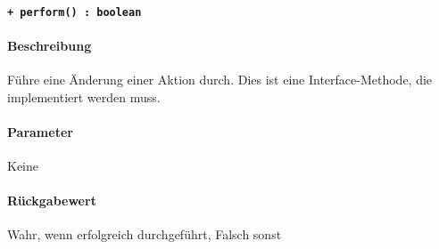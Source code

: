 \paragraph{\texttt{+ perform() : boolean}}%
\paragraph*{Beschreibung}
Führe eine Änderung einer Aktion durch.
Dies ist eine Interface-Methode, die implementiert werden muss.
\paragraph*{Parameter}
Keine
\paragraph*{Rückgabewert}
Wahr, wenn erfolgreich durchgeführt, Falsch sonst
